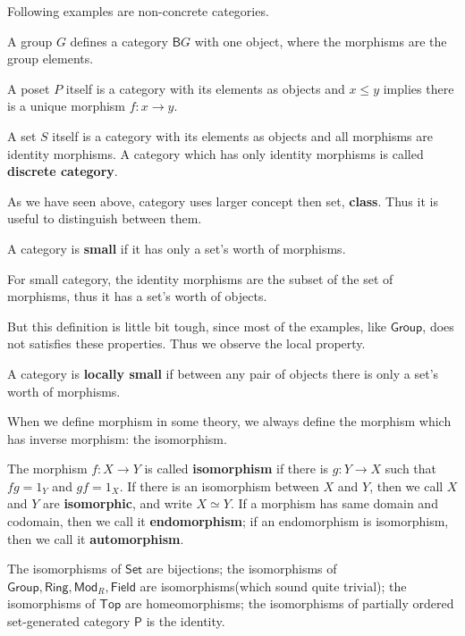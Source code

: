 \begin{exmp} Following examples are non-concrete categories.
\item A group $G$ defines a category $\mathsf{B}G$ with one object, where the morphisms are the group elements.
\item A poset $P$ itself is a category with its elements as objects and $x\leq y$ implies there is a unique morphism $f:x\rightarrow y$.
\item A set $S$ itself is a category with its elements as objects and all morphisms are identity morphisms. A category which has only identity morphisms is called \textbf{discrete category}.
\end{exmp}

As we have seen above, category uses larger concept then set, \textbf{class}. Thus it is useful to distinguish between them.
\begin{defn} A category is \textbf{small} if it has only a set's worth of morphisms.
\end{defn}
For small category, the identity morphisms are the subset of the set of morphisms, thus it has a set's worth of objects.

But this definition is little bit tough, since most of the examples, like $\textsf{Group}$, does not satisfies these properties. Thus we observe the local property.
\begin{defn} A category is \textbf{locally small} if between any pair of objects there is only a set's worth of morphisms.
\end{defn}

When we define morphism in some theory, we always define the morphism which has inverse morphism: the isomorphism.
\begin{defn} The morphism $f:X\rightarrow Y$ is called \textbf{isomorphism} if there is $g:Y\rightarrow X$ such that $fg=1_Y$ and $gf=1_X$. If there is an isomorphism between $X$ and $Y$, then we call $X$ and $Y$ are \textbf{isomorphic}, and write $X\simeq Y$. If a morphism has same domain and codomain, then we call it \textbf{endomorphism}; if an endomorphism is isomorphism, then we call it \textbf{automorphism}.
\end{defn}

The isomorphisms of $\mathsf{Set}$ are bijections; the isomorphisms of $\mathsf{Group},\mathsf{Ring},\mathsf{Mod}_R,\mathsf{Field}$ are isomorphisms(which sound quite trivial); the isomorphisms of $\mathsf{Top}$ are homeomorphisms; the isomorphisms of partially ordered set-generated category $\mathsf{P}$ is the identity.

